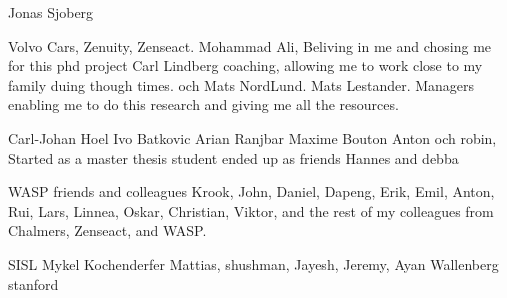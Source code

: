 Jonas Sjoberg

Volvo Cars, Zenuity, Zenseact. 
Mohammad Ali, Beliving in me and chosing me for this phd project 
Carl Lindberg coaching, allowing me to work close to my family duing though times. 
och Mats NordLund. Mats Lestander. Managers enabling me to do this research and giving me all the resources. 

Carl-Johan Hoel
Ivo Batkovic
Arian Ranjbar
Maxime Bouton 
Anton och robin, Started as a master thesis student ended up as friends
Hannes and debba

WASP 
friends and colleagues Krook, John, Daniel, Dapeng, Erik, Emil, Anton, Rui, Lars, Linnea, Oskar, Christian, Viktor, and the rest of my colleagues from Chalmers, Zenseact, and WASP.

SISL 
Mykel Kochenderfer
Mattias, shushman, Jayesh, Jeremy, Ayan 
Wallenberg stanford 




 



